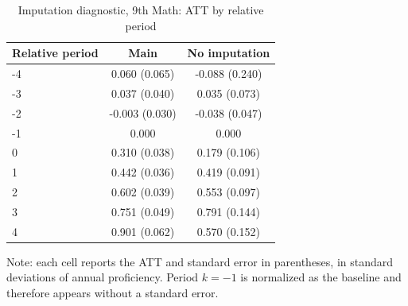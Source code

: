﻿\begin{table}[!htbp]
\centering
\caption{Imputation diagnostic, 9th Math: ATT by relative period}
\label{tab:ap_event_imputacao_9th_mat}
\vspace{-0.15cm}
\scriptsize
\setlength{\tabcolsep}{4pt}
\renewcommand{\arraystretch}{0.92}
\begin{tabular}{lcc}
\toprule
Relative period & Main & No imputation \\
\midrule
-4 & 0.060 (0.065) & -0.088 (0.240) \\
-3 & 0.037 (0.040) & 0.035 (0.073) \\
-2 & -0.003 (0.030) & -0.038 (0.047) \\
-1 & 0.000 & 0.000 \\
0 & 0.310 (0.038) & 0.179 (0.106) \\
1 & 0.442 (0.036) & 0.419 (0.091) \\
2 & 0.602 (0.039) & 0.553 (0.097) \\
3 & 0.751 (0.049) & 0.791 (0.144) \\
4 & 0.901 (0.062) & 0.570 (0.152) \\
\bottomrule
\end{tabular}
\begin{flushleft}
\footnotesize Note: each cell reports the ATT and standard error in parentheses, in standard deviations of annual proficiency. Period \(k=-1\) is normalized as the baseline and therefore appears without a standard error.
\end{flushleft}
\end{table}



